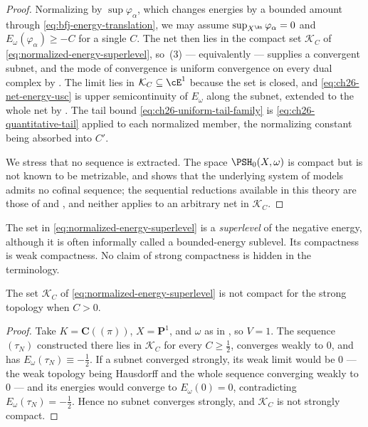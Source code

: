\begin{proof}
Normalizing by \(\sup\varphi_\alpha\), which changes energies by a bounded
amount through \eqref{eq:bfj-energy-translation}, we may assume
\(\sup_{X^{\An}}\varphi_\alpha=0\) and
\(E_\omega(\varphi_\alpha)\geq-C\) for a single \(C\).  The net then lies in
the compact set \(\mathcal K_C\) of \eqref{eq:normalized-energy-superlevel},
so \,(3) --- equivalently
 --- supplies a convergent subnet, and the
mode of convergence is uniform convergence on every dual complex by
.  The limit lies in
\(\mathcal K_C\subseteq\cE^1\) because the set is closed, and
\eqref{eq:ch26-net-energy-usc} is upper semicontinuity of \(E_\omega\) along
the subnet, extended to the whole net by
.  The tail bound
\eqref{eq:ch26-uniform-tail-family} is
\eqref{eq:ch26-quantitative-tail} applied to each normalized member, the
normalizing constant being absorbed into \(C'\).

We stress that no sequence is extracted.  The space \(\PSH_0(X,\omega)\) is
compact but is not known to be metrizable, and
 shows that the underlying system of
models admits no cofinal sequence; the sequential reductions available in
this theory are those of
 and
, and neither applies to an arbitrary net in
\(\mathcal K_C\).
\end{proof}

\begin{remark}
The set in \eqref{eq:normalized-energy-superlevel} is a \emph{superlevel} of
the negative energy, although it is often informally called a bounded-energy
sublevel. Its compactness is weak compactness. No claim of strong compactness
is hidden in the terminology.
\end{remark}

\begin{proposition}
\label{prop:ch26-no-strong-compactness}
The set \(\mathcal K_C\) of \eqref{eq:normalized-energy-superlevel} is not
compact for the strong topology when \(C>0\).
\end{proposition}

\begin{proof}
Take \(K=\mathbf C((\pi))\), \(X=\mathbf P^1\), and \(\omega\) as in
, so \(V=1\).  The sequence \((\tau_N)\) constructed
there lies in \(\mathcal K_C\) for every \(C\geq\tfrac12\), converges weakly
to \(0\), and has \(E_\omega(\tau_N)\equiv-\tfrac12\).  If a subnet converged
strongly, its weak limit would be \(0\) --- the weak topology being Hausdorff
and the whole sequence converging weakly to \(0\) --- and its energies would
converge to \(E_\omega(0)=0\), contradicting
\(E_\omega(\tau_N)=-\tfrac12\).  Hence no subnet converges strongly, and
\(\mathcal K_C\) is not strongly compact.
\end{proof}


